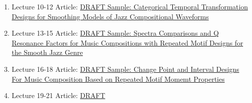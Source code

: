 \documentclass{TMLSStyleGuideResumeVitae}
\begin{document}
\begin{enumerate}
\item Lecture 10-12 Article: \href{https://github.com/MathematicalLearningSpace/Reading-Room-A/blob/master/Classroom%20Lecture%20Model%20Series_Course_4_Topic%201_Lecture_10-11-12_Journal_Article_4.tex}{DRAFT 
Sample: Categorical Temporal Transformation Designs for 
Smoothing Models of Jazz Compositional Waveforms}
\item Lecture 13-15 Article: \href{https://github.com/MathematicalLearningSpace/Reading-Room-A/blob/master/Classroom%20Lecture%20Model%20Series_Course_4_Topic%201_Lecture_13_14_15_Journal_Article_5.tex}{DRAFT
Sample: Spectra Comparisons and Q Resonance Factors for Music Compositions 
with Repeated Motif Designs for the Smooth Jazz Genre}
\item Lecture 16-18 Article: \href{https://github.com/MathematicalLearningSpace/Reading-Room-A/blob/master/Classroom%20Lecture%20Model%20Series_Course_4_Topic%201_Lecture_16-17-18_Journal_Article_6.tex}{DRAFT 
Sample: Change Point and Interval Designs For 
Music Composition Based on Repeated Motif Momemt Properties}
\item Lecture 19-21 Article: \href{https://github.com/MathematicalLearningSpace/Reading-Room-A/blob/master/Classroom%20Lecture%20Model%20Series_Course_4_Topic%201_Lecture_19_20_21_Journal_Article_7.tex}{DRAFT
}
\end{enumerate}
\end{document}
